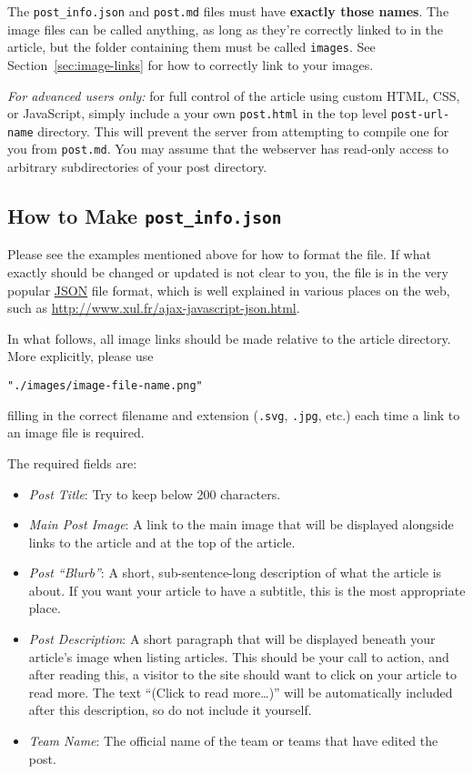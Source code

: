 \documentclass[paper=a4, fontsize=11pt]{scrartcl}
\numberwithin{equation}{section}        %
\numberwithin{figure}{section}            %
\numberwithin{table}{section}                %
\begin{document}
The \texttt{post\_info.json} and \texttt{post.md} files must have
\textbf{exactly those names}. The image files can be called anything, as long as
they're correctly linked to in the article, but the
folder containing them must be called \texttt{images}. See Section~\ref{sec:image-links}
for how to correctly link to your images.

\emph{For advanced users only:} for full control of the article using custom
HTML, CSS, or JavaScript, simply include a your own \texttt{post.html} in
the top level \texttt{post-url-name} directory. This will
prevent the server from attempting to compile one for you from \texttt{post.md}.
You may assume that the webserver has read-only access to arbitrary
subdirectories of your post directory.

\subsection{How to Make \texttt{\textbf{post\_info.json}}}
Please see the examples mentioned above for how to format the file. If what
exactly should be changed or updated is not clear to you, the file is in the
very popular \href{http://www.xul.fr/ajax-javascript-json.html}{JSON} file
format, which is well explained in various places on the web, such as
\url{http://www.xul.fr/ajax-javascript-json.html}.

In what follows, all image links should be made relative to the article
directory. More explicitly, please use
\begin{verbatim}"./images/image-file-name.png"\end{verbatim}
filling in the correct filename and extension (\texttt{.svg}, \texttt{.jpg},
etc.) each time a link to an image file is required.

\noindent{}The required fields are:\@
\begin{itemize}
    \item \emph{Post Title}: Try to keep below 200 characters.
    \item \emph{Main Post Image}: A link to the main image that will be
        displayed alongside links to the article and at the top of the article.
    \item \emph{Post ``Blurb''}: A short, sub-sentence-long description of what
        the article is about. If you want your article to have a subtitle, this
        is the most appropriate place.
    \item \emph{Post Description}: A short paragraph that will be displayed
        beneath your article's image when listing articles. This should be your
        call to action, and after reading this, a visitor to the site should
        want to click on your article to read more. The text ``(Click to read
        more\ldots{})'' will be automatically included after this description, so do
        not include it yourself.
    \item \emph{Team Name}: The official name of the team or teams that have edited the
        post.
\end{itemize}
\end{document}
